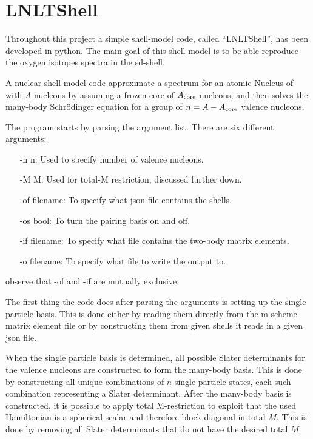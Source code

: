 \section{LNLTShell}

Throughout this project a simple shell-model code, called ``LNLTShell'', has been developed in python. The main goal of this shell-model is to be able reproduce the oxygen isotopes spectra in the sd-shell.

A nuclear shell-model code approximate a spectrum for an atomic Nucleus of with \(A\) nucleons by assuming a frozen core of \(A_{\rm{core}}\) nucleons, and then solves the many-body Schrödinger equation %
for a group of \(n=A-A_{\rm{core}}\) valence nucleons.



The program starts by parsing the argument list. There are six different arguments:
\begin{itemize}
\item[-n n:] Used to specify number of valence nucleons.
\item[-M M:] Used for total-M restriction, discussed further down.
\item[-of filename:] To specify what json file contains the shells.
\item[-os bool:] To turn the pairing basis on and off.
\item[-if filename:] To specify what file contains the two-body matrix elements.
\item[-o filename:] To specify what file to write the output to.
\end{itemize}
observe that -of and -if are mutually exclusive.




The first thing the code does after parsing the arguments is setting up the single particle basis.
This is done either by reading them directly from the m-scheme matrix element file %
or by constructing them from given shells it reads in a given json file.



When the single particle basis is determined, all possible Slater determinants for the valence nucleons are constructed to form the many-body basis.
This is done by constructing all unique combinations of \(n\) single particle states, each such combination representing a Slater determinant.
After the many-body basis is constructed, it is possible to apply total M-restriction to exploit that the used Hamiltonian is a spherical scalar and therefore block-diagonal in total \(M\). This is done by removing all Slater determinants that do not have the desired total \(M\).

